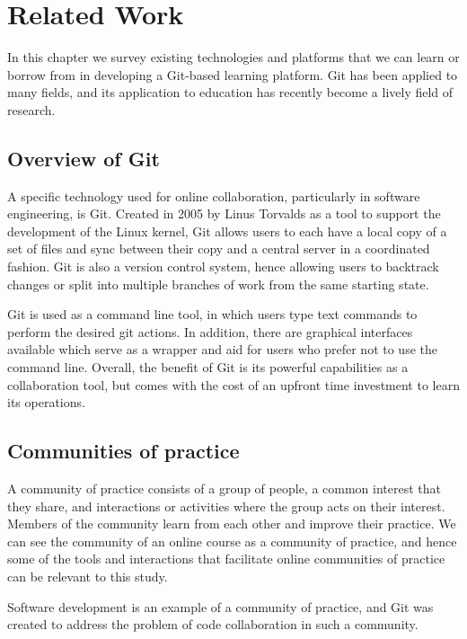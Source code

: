 \documentclass[12pt,twoside,vi]{mitthesis}
\begin{document}
\cite{learningcreativelearning}

\chapter{Related Work}

In this chapter we survey existing technologies and platforms that we can learn or borrow from in developing a Git-based learning platform. Git has been applied to many fields, and its application to education has recently become a lively field of research. 

\section{Overview of Git}

A specific technology used for online collaboration, particularly in software engineering, is Git. Created in 2005 by Linus Torvalds as a tool to support the development of the Linux kernel, Git allows users to each have a local copy of a set of files and sync between their copy and a central server in a coordinated fashion. Git is also a version control system, hence allowing users to backtrack changes or split into multiple branches of work from the same starting state.

Git is used as a command line tool, in which users type text commands to perform the desired git actions. In addition, there are graphical interfaces available which serve as a wrapper and aid for users who prefer not to use the command line. Overall, the benefit of Git is its powerful capabilities as a collaboration tool, but comes with the cost of an upfront time investment to learn its operations.~\cite{githistory}

\section{Communities of practice}

A community of practice consists of a group of people, a common interest that they share, and interactions or activities where the group acts on their interest. Members of the community learn from each other and improve their practice. We can see the community of an online course as a community of practice, and hence some of the tools and interactions that facilitate online communities of practice can be relevant to this study.~\cite{teachingdigital}

Software development is an example of a community of practice, and Git was created to address the problem of code collaboration in such a community. 
\end{document}
